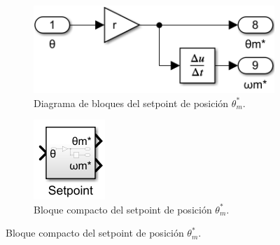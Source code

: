 \documentclass{article}
\begin{document}
\begin{figure}[H]
    \centering
    \begin{subfigure}[t]{0.5\textwidth}
        \centering
        \includegraphics[width=\textwidth]{Imagenes/setpoint.png}
        \caption{Diagrama de bloques del setpoint de posición \(\theta_m^*\).}
        \label{fig:setpoint}
    \end{subfigure}
    \hfill %
    \begin{subfigure}[t]{0.2\textwidth}
        \centering
        \includegraphics[width=\textwidth]{Imagenes/setpoint_compacto.png}
        \caption{Bloque compacto del setpoint de posición \(\theta_m^*\).}
        \label{fig:setpoint_compacto}
    \end{subfigure}
\end{figure}
\end{document}
